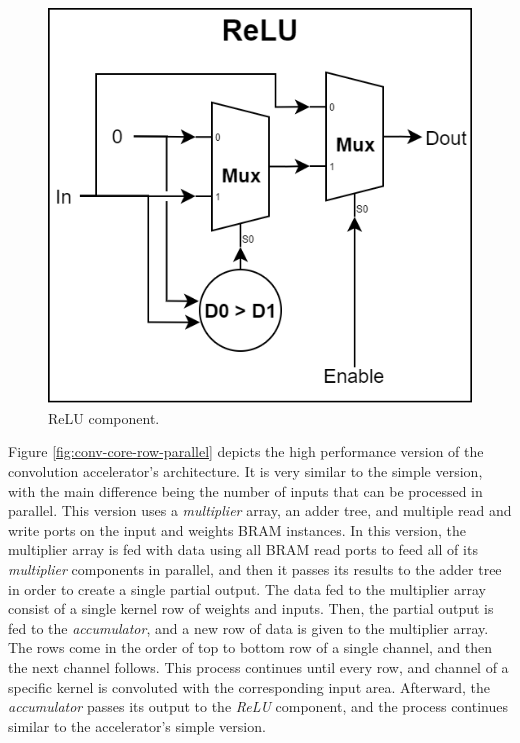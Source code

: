 \begin{figure} [H]
	\centering
	\includegraphics[scale=0.4]{Images/Platform/ReLU_component.png}
	\decoRule
	\caption[ReLU component]{ReLU component.}
	\label{fig:relu-component}
\end{figure}

Figure \ref{fig:conv-core-row-parallel} depicts the high performance version of the convolution accelerator's architecture. It is very similar to the simple version, with the main difference being the number of inputs that can be processed in parallel. This version uses a \emph{multiplier} array, an adder tree, and multiple read and write ports on the input and weights BRAM instances. In this version, the multiplier array is fed with data using all BRAM read ports to feed all of its \emph{multiplier} components in parallel, and then it passes its results to the adder tree in order to create a single partial output. The data fed to the multiplier array consist of a single kernel row of weights and inputs. Then, the partial output is fed to the \emph{accumulator}, and a new row of data is given to the multiplier array. The rows come in the order of top to bottom row of a single channel, and then the next channel follows. This process continues until every row, and channel of a specific kernel is convoluted with the corresponding input area. Afterward, the \emph{accumulator} passes its output to the \emph{ReLU} component, and the process continues similar to the accelerator's simple version.

